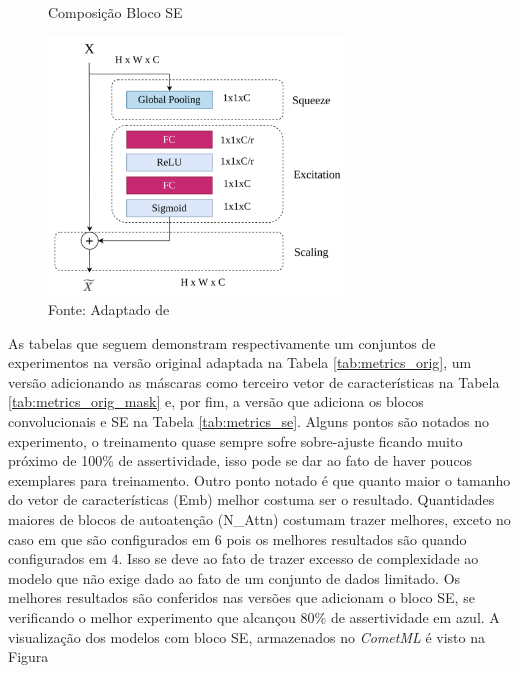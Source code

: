 \begin{figure}[h!]
    \centering
    \caption{Composição Bloco SE}
    \includegraphics[width=0.7\textwidth]{figures/fig031.png}
    \caption*{Fonte: Adaptado de \cite{lafraxoSEDARUnetSqueezeexcitationDilated2024}}
    \label{fig:fig031}
\end{figure}

As tabelas que seguem demonstram respectivamente um conjuntos de experimentos na versão original adaptada na Tabela \ref{tab:metrics_orig}, um versão adicionando as máscaras como terceiro vetor de características na Tabela \ref{tab:metrics_orig_mask} e, por fim, a versão que adiciona os blocos convolucionais e \gls{SE} na Tabela \ref{tab:metrics_se}. Alguns pontos são notados no experimento, o treinamento quase sempre sofre sobre-ajuste ficando muito próximo de 100\% de assertividade, isso pode se dar ao fato de haver poucos exemplares para treinamento. Outro ponto notado é que quanto maior o tamanho do vetor de características (Emb) melhor costuma ser o resultado. Quantidades maiores de blocos de autoatenção (N\_Attn) costumam trazer melhores, exceto no caso em que são configurados em $6$ pois os melhores resultados são quando configurados em $4$. Isso se deve ao fato de trazer excesso de complexidade ao modelo que não exige dado ao fato de um conjunto de dados limitado. Os melhores resultados são conferidos nas versões que adicionam o bloco \gls{SE}, se verificando o melhor experimento que alcançou $80\%$ de assertividade em azul. A visualização dos modelos com bloco \gls{SE}, armazenados no \textit{CometML} é visto na Figura


